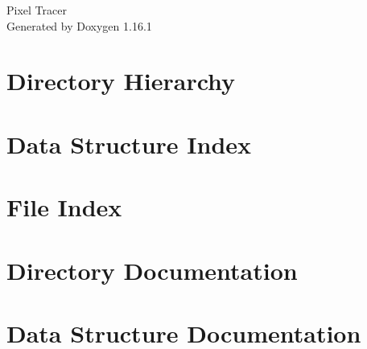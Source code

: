 \documentclass[twoside]{book}
\newcommand{\+}{\discretionary{\mbox{\scriptsize$\hookleftarrow$}}{}{}}
\newcommand{\clearemptydoublepage}{%
    \newpage{\pagestyle{empty}\cleardoublepage}%
  }
\begin{document}
  \raggedbottom
    \hypersetup{pageanchor=false,
                bookmarksnumbered=true,
                pdfencoding=unicode
               }
  \begin{titlepage}
  \vspace*{7cm}
  \begin{center}%
  {\Large Pixel Tracer}\\
  \vspace*{1cm}
  {\large Generated by Doxygen 1.16.1}\\
  \end{center}
  \end{titlepage}
  \clearemptydoublepage
  \tableofcontents
  \clearemptydoublepage
  \hypersetup{pageanchor=true}

\chapter{Directory Hierarchy}

\chapter{Data Structure Index}

\chapter{File Index}

\chapter{Directory Documentation}














\chapter{Data Structure Documentation}






















\end{document}
